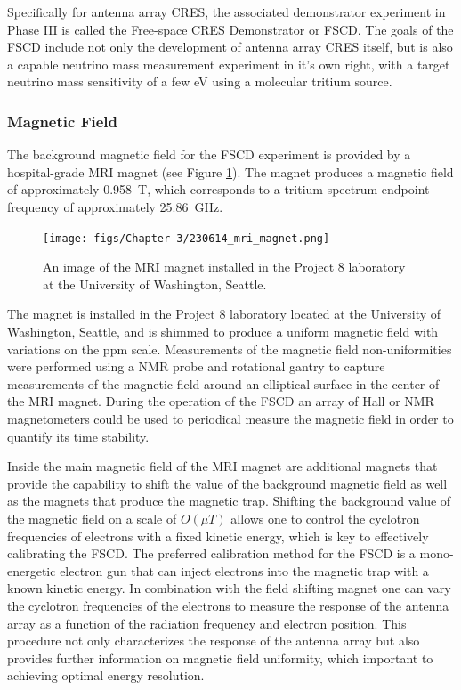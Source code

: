 Specifically for antenna array CRES, the associated demonstrator experiment in Phase III is called the Free-space CRES Demonstrator or FSCD. The goals of the FSCD include not only the development of antenna array CRES itself, but is also a capable neutrino mass measurement experiment in it's own right, with a target neutrino mass sensitivity of a few eV using a molecular tritium source.  

\subsubsection*{Magnetic Field}

The background magnetic field for the FSCD experiment is provided by a hospital-grade MRI magnet (see Figure \ref{fig:chap3-mri-magnet}). The magnet produces a magnetic field of approximately 0.958~T, which corresponds to a tritium spectrum endpoint frequency of approximately 25.86~GHz. 
\begin{figure}[htbp]
    \centering
    \texttt{[image: figs/Chapter-3/230614\_mri\_magnet.png]}
    \caption{\label{fig:chap3-mri-magnet} An image of the MRI magnet installed in the Project 8 laboratory at the University of Washington, Seattle.}
\end{figure}
The magnet is installed in the Project 8 laboratory located at the University of Washington, Seattle, and is shimmed to produce a uniform magnetic field with variations on the ppm scale. Measurements of the magnetic field non-uniformities were performed using a NMR probe and rotational gantry to capture measurements of the magnetic field around an elliptical surface in the center of the MRI magnet. During the operation of the FSCD an array of Hall or NMR magnetometers could be used to periodical measure the magnetic field in order to quantify its time stability.

Inside the main magnetic field of the MRI magnet are additional magnets that provide the capability to shift the value of the background magnetic field as well as the magnets that produce the magnetic trap. Shifting the background value of the magnetic field on a scale of $O(\mu T)$ allows one to control the cyclotron frequencies of electrons with a fixed kinetic energy, which is key to effectively calibrating the FSCD. The preferred calibration method for the FSCD is a mono-energetic electron gun that can inject electrons into the magnetic trap with a known kinetic energy. In combination with the field shifting magnet one can vary the cyclotron frequencies of the electrons to measure the response of the antenna array as a function of the radiation frequency and electron position. This procedure not only characterizes the response of the antenna array but also provides further information on magnetic field uniformity, which important to achieving optimal energy resolution.


